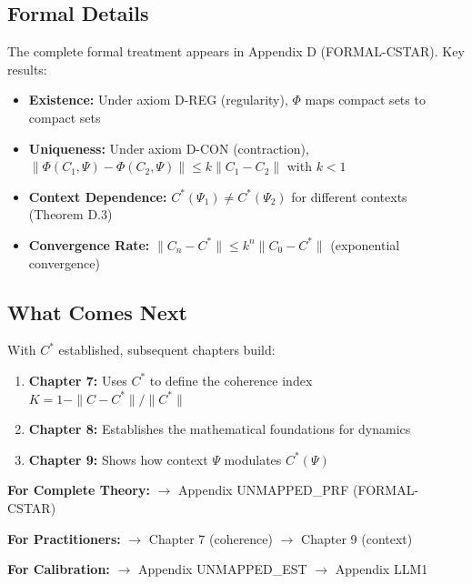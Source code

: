 \subsection{Formal Details}
\label{sec:ch6-formal-details}

The complete formal treatment appears in Appendix D (FORMAL-CSTAR). Key results:

\begin{itemize}[nosep]
    \item \textbf{Existence:} Under axiom D-REG (regularity), $\Phi$ maps compact sets to compact sets
    \item \textbf{Uniqueness:} Under axiom D-CON (contraction), $\|\Phi(C_1,\Psi) - \Phi(C_2,\Psi)\| \leq k\|C_1 - C_2\|$ with $k < 1$
    \item \textbf{Context Dependence:} $C^*(\Psi_1) \neq C^*(\Psi_2)$ for different contexts (Theorem D.3)
    \item \textbf{Convergence Rate:} $\|C_n - C^*\| \leq k^n \|C_0 - C^*\|$ (exponential convergence)
\end{itemize}

\subsection{What Comes Next}
\label{sec:ch6-next}

With $C^*$ established, subsequent chapters build:

\begin{enumerate}[nosep]
    \item \textbf{Chapter 7:} Uses $C^*$ to define the coherence index $K = 1 - \|C - C^*\|/\|C^*\|$
    \item \textbf{Chapter 8:} Establishes the mathematical foundations for dynamics
    \item \textbf{Chapter 9:} Shows how context $\Psi$ modulates $C^*(\Psi)$
\end{enumerate}

\begin{tcolorbox}[
    colback=gray!10!white,
    colframe=gray!75!black,
    title={\textbf{Reading Paths}}
]
\textbf{For Complete Theory:} $\rightarrow$ Appendix UNMAPPED_PRF (FORMAL-CSTAR)

\textbf{For Practitioners:} $\rightarrow$ Chapter 7 (coherence) $\rightarrow$ Chapter 9 (context)

\textbf{For Calibration:} $\rightarrow$ Appendix UNMAPPED_EST $\rightarrow$ Appendix LLM1
\end{tcolorbox}

